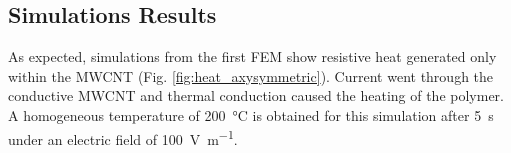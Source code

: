 \documentclass[11pt,review,times]{article}
\begin{document}
\begin{table}[h]
\center
{}
\caption{Material properties, unless noted, the properties for PEI are taken from SABIC's technical documentation}
\label{tab:material_properties}
\end{table}

\FloatBarrier
\subsection{Simulations Results}

As expected, simulations from the first FEM show resistive heat generated only within the MWCNT (Fig. \ref{fig:heat_axysymmetric}). 
Current went through the conductive MWCNT and thermal conduction caused the heating of the polymer. 
A homogeneous temperature of \SI{200}{\celsius} is obtained for this simulation after \SI{5}{\second} under an electric field of \SI{100}{\volt\per\metre}. 
\end{document}
